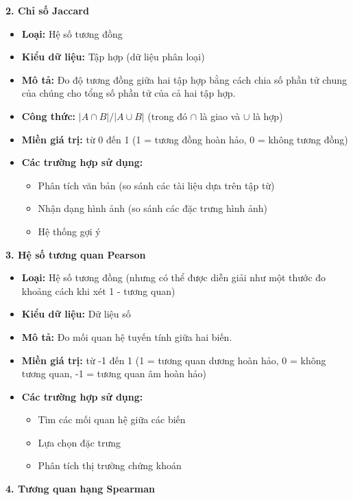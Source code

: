 \textbf{2. Chỉ số Jaccard}

\begin{itemize}
  \item \textbf{Loại:} Hệ số tương đồng
  \item \textbf{Kiểu dữ liệu:} Tập hợp (dữ liệu phân loại)
  \item \textbf{Mô tả:} Đo độ tương đồng giữa hai tập hợp bằng cách chia số phần tử chung của chúng cho tổng số phần tử của cả hai tập hợp.
  \item \textbf{Công thức:} $|A \cap B| / |A \cup B|$ (trong đó $\cap$ là giao và $\cup$ là hợp)
  \item \textbf{Miền giá trị:} từ 0 đến 1 (1 = tương đồng hoàn hảo, 0 = không tương đồng)
  \item \textbf{Các trường hợp sử dụng:}
  \begin{itemize}
    \item Phân tích văn bản (so sánh các tài liệu dựa trên tập từ)
    \item Nhận dạng hình ảnh (so sánh các đặc trưng hình ảnh)
    \item Hệ thống gợi ý
  \end{itemize}
\end{itemize}

\textbf{3. Hệ số tương quan Pearson}

\begin{itemize}
  \item \textbf{Loại:} Hệ số tương đồng (nhưng có thể được diễn giải như một thước đo khoảng cách khi xét 1 - tương quan)
  \item \textbf{Kiểu dữ liệu:} Dữ liệu số
  \item \textbf{Mô tả:} Đo mối quan hệ tuyến tính giữa hai biến.
  \item \textbf{Miền giá trị:} từ -1 đến 1 (1 = tương quan dương hoàn hảo, 0 = không tương quan, -1 = tương quan âm hoàn hảo)
  \item \textbf{Các trường hợp sử dụng:}
  \begin{itemize}
    \item Tìm các mối quan hệ giữa các biến
    \item Lựa chọn đặc trưng
    \item Phân tích thị trường chứng khoán
  \end{itemize}
\end{itemize}

\textbf{4. Tương quan hạng Spearman}

